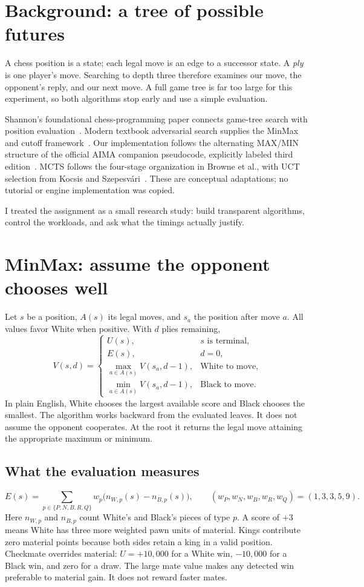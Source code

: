 \documentclass[10pt,letterpaper]{article}
\newcommand{\talk}[1]{\par\smallskip\noindent{\color{teal}\textbf{Meeting takeaway.}} #1\par}
\begin{document}
\section{Background: a tree of possible futures}
A chess position is a state; each legal move is an edge to a successor state. A \emph{ply} is one player's move. Searching to depth three therefore examines our move, the opponent's reply, and our next move. A full game tree is far too large for this experiment, so both algorithms stop early and use a simple evaluation.

Shannon's foundational chess-programming paper connects game-tree search with position evaluation~\cite{shannon1950}. Modern textbook adversarial search supplies the MinMax and cutoff framework~\cite{aima2021}. Our implementation follows the alternating MAX/MIN structure of the official AIMA companion pseudocode, explicitly labeled third edition~\cite{aimaPseudocode}. MCTS follows the four-stage organization in Browne et al., with UCT selection from Kocsis and Szepesv\'ari~\cite{browne2012,kocsis2006}. These are conceptual adaptations; no tutorial or engine implementation was copied.

\talk{I treated the assignment as a small research study: build transparent algorithms, control the workloads, and ask what the timings actually justify.}

\newpage
\section{MinMax: assume the opponent chooses well}
Let $s$ be a position, $A(s)$ its legal moves, and $s_a$ the position after move $a$. All values favor White when positive. With $d$ plies remaining,
\[
V(s,d)=\begin{cases}
U(s),&s\text{ is terminal},\\
E(s),&d=0,\\
\max_{a\in A(s)}V(s_a,d-1),&\text{White to move},\\
\min_{a\in A(s)}V(s_a,d-1),&\text{Black to move}.
\end{cases}
\]
In plain English, White chooses the largest available score and Black chooses the smallest. The algorithm works backward from the evaluated leaves. It does not assume the opponent cooperates. At the root it returns the legal move attaining the appropriate maximum or minimum.

\subsection{What the evaluation measures}
\[
E(s)=\sum_{p\in\{P,N,B,R,Q\}} w_p\bigl(n_{W,p}(s)-n_{B,p}(s)\bigr),
\qquad (w_P,w_N,w_B,w_R,w_Q)=(1,3,3,5,9).
\]
Here $n_{W,p}$ and $n_{B,p}$ count White's and Black's pieces of type $p$. A score of $+3$ means White has three more weighted pawn units of material. Kings contribute zero material points because both sides retain a king in a valid position. Checkmate overrides material: $U=+10{,}000$ for a White win, $-10{,}000$ for a Black win, and zero for a draw. The large mate value makes any detected win preferable to material gain. It does not reward faster mates.
\end{document}
